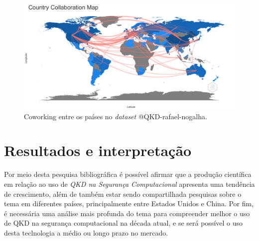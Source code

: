 \begin{figure}[H]
    \centering
    \includegraphics[width=1\textwidth]{experiments/rafaelnogalha/PesquisaBibliografica/QKDSegurancaComputacional/images/country_collaboration_map.png}
    \caption{Coworking entre os países no \textit{dataset} @QKD-rafael-nogalha.}
    \label{fig:cowrking:prod:@QKD-rafael-nogalha}
\end{figure}



\section{Resultados e interpretação}

Por meio desta pesquisa bibliográfica é possível afirmar que a produção científica em relação ao uso de \textit{QKD na Segurança Computacional} apresenta uma tendência de crescimento, além de também estar sendo compartilhada pesquisas sobre o tema em diferentes países, principalmente entre Estados Unidos e China. Por fim, é necessária uma análise mais profunda do tema para compreender melhor o uso de QKD na segurança computacional na década atual, e se será possível o uso desta teclnologia a médio ou longo prazo no mercado.

